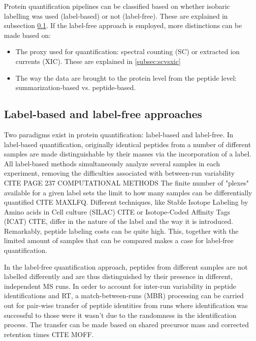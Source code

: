 \documentclass[11pt, a4paper]{report}
\begin{document}
Protein quantification pipelines can be classified based on whether isobaric labelling was used (label-based) or not (label-free). These are explained in subsection \ref{subsec:labelling}. If the label-free approach is employed, more distinctions can be made based on:

\begin{itemize}
\item The proxy used for quantification: spectral counting (\ac{SC}) or extracted ion currents (\ac{XIC}). These are explained in \ref{subsec:scvsxic}


\item The way the data are brought to the protein level from the peptide level: summarization-based vs. peptide-based.
\end{itemize}

\subsection{Label-based and label-free approaches}
\label{subsec:labelling}

Two paradigms exist in protein quantification: label-based and label-free. In label-based quantification, originally identical peptides from a number of different samples are made distinguishable by their masses via the incorporation of a label. All label-based methods simultaneously analyze several samples in each experiment, removing the difficulties associated with between-run variability CITE PAGE 237 COMPUTATIONAL METHODS The finite number of "plexes" available for a given label sets the limit to how many samples can be differentially quantified CITE MAXLFQ. Different techniques, like Stable Isotope Labeling by Amino acids in Cell culture (SILAC) CITE or Isotope-Coded Affinity Tags (ICAT) CITE, differ in the nature of the label and the way it is introduced. Remarkably, peptide labeling costs can be quite high. This, together with the limited amount of samples that can be compared makes a case for label-free quantification.

In the label-free quantification approach, peptides from different samples are not labelled differently and are thus distinguished by their presence in different, independent \ac{MS} runs. In order to account for inter-run variability in peptide identifications and \ac{RT}, a match-between-runs (MBR) processing can be carried out for pair-wise transfer of peptide identities from runs where identification was successful to those were it wasn't due to the randomness in the identification process. The transfer can be made based on shared precursor mass and corrected retention times CITE MOFF.
\end{document}
